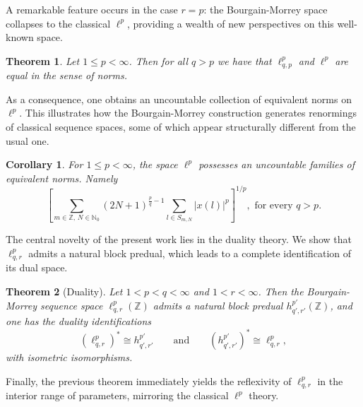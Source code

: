\documentclass[preprint,12pt]{elsarticle}
\newtheorem{theorem}{Theorem}[section]
\newtheorem{corollary}{Corollary}[theorem]
\begin{document}
A remarkable feature occurs in the case $r=p$: the Bourgain-Morrey space 
collapses to the classical $\ell^p$, providing a wealth of new perspectives on 
this well-known space.
\begin{theorem}\label{equivalent norms}
    Let $1\leq p<\infty$. Then for all $q>p$ we have that $\ell^{p}_{q,p}$ and $\ell^{p}$ are equal in the sense of norms.
\end{theorem}
As a consequence, one obtains an uncountable collection of equivalent norms 
on $\ell^p$. This illustrates how the Bourgain-Morrey construction generates 
renormings of classical sequence spaces, some of which appear structurally 
different from the usual one.
\begin{corollary}
    For $1\leq p<\infty$, the space $\ell^{p}$ possesses an uncountable families of equivalent norms. Namely
    \begin{equation*}
\left[\sum\limits_{m\in\mathbb{Z},\,N\in\mathbb{N}_{0}}
(2N+1) ^{\frac{p}{q}-1}
\sum\limits_{l\in S_{m,N}  }
\left\vert x(l)\right\vert ^{p}\right]  ^{1/p},\text{ for every } q>p.
    \end{equation*}
\end{corollary}
The central novelty of the present work lies in the duality theory. 
We show that $\ell^{p}_{q,r}$ admits a natural block predual, which 
leads to a complete identification of its dual space.
\begin{theorem}[Duality]\label{thm:duality-main}
Let $1<p<q<\infty$ and $1<r<\infty$. Then the Bourgain-Morrey sequence space 
$\ell^{p}_{q,r}(\mathbb{Z})$ admits a natural block predual $h^{p'}_{q',r'}(\mathbb{Z})$, and one has the duality identifications
\[
(\ell^{p}_{q,r})^* \cong h^{p'}_{q',r'} 
\qquad \text{and} \qquad
(h^{p'}_{q',r'})^* \cong \ell^{p}_{q,r},
\]
with isometric isomorphisms.
\end{theorem}
Finally, the previous theorem immediately yields the reflexivity of 
$\ell^{p}_{q,r}$ in the interior range of parameters, mirroring the classical 
$\ell^p$ theory.
\end{document}
